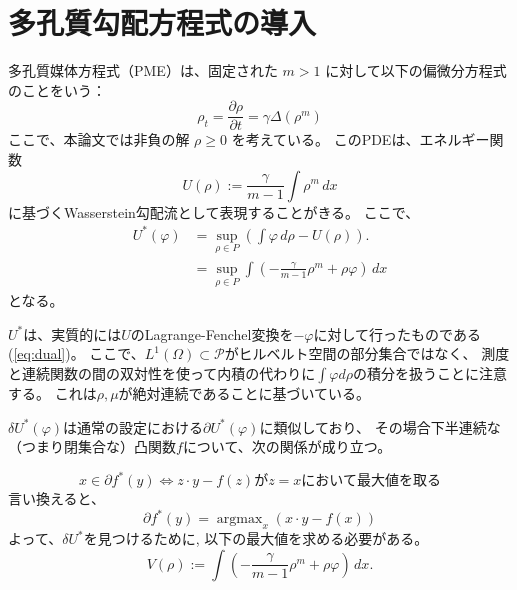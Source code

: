 \section{多孔質勾配方程式の導入}
\label{sect:多孔質勾配方程式の導入}
多孔質媒体方程式（PME）は、固定された \(m > 1\) に対して以下の偏微分方程式のことをいう：
\[
\rho_t = \frac{{\partial \rho}}{{\partial t}} = \gamma\Delta (\rho^m)
\]
ここで、本論文では非負の解 \(\rho \geq 0\) を考えている。
このPDEは、エネルギー関数
\[
    U(\rho) := \frac{\gamma}{{m-1}} \int \rho^m \, dx
\]
に基づくWasserstein勾配流として表現することがきる。
ここで、
\begin{align*}
    U^*(\varphi) &= \sup_{\rho \in P} \left( \int \varphi \, d\rho - U(\rho) \right).\\
                &= \sup_{\rho \in P} \int \left(- \frac{\gamma}{m-1}\rho^m + \rho\varphi\right) \, dx
\end{align*}
となる。

$U^*$は、実質的には$U$のLagrange-Fenchel変換を$-\varphi$に対して行ったものである(\ref{eq:dual})。
ここで、$L^1(\Omega) \subset \mathcal{P}$がヒルベルト空間の部分集合ではなく、
測度と連続関数の間の双対性を使って内積の代わりに$\int \varphi d \rho$の積分を扱うことに注意する。
これは$\rho, \mu$が絶対連続であることに基づいている。


$\delta U^*(\varphi)$は通常の設定における$\partial U^*(\varphi)$に類似しており、
その場合下半連続な（つまり閉集合な）凸関数$f$について、次の関係が成り立つ。

\[
    x \in \partial f^*(y) \iff z \cdot y - f(z) \text{が} z = x \text{において最大値を取る}
\]
言い換えると、
\[
    \partial f^*(y) = \operatorname{argmax}_x (x \cdot y - f(x))
\]
よって、$\delta U^*$を見つけるために, 以下の最大値を求める必要がある。
\[
    V(\rho) := \int \left(- \frac{\gamma}{m-1}\rho^m + \rho\varphi\right) \, dx.
\]

